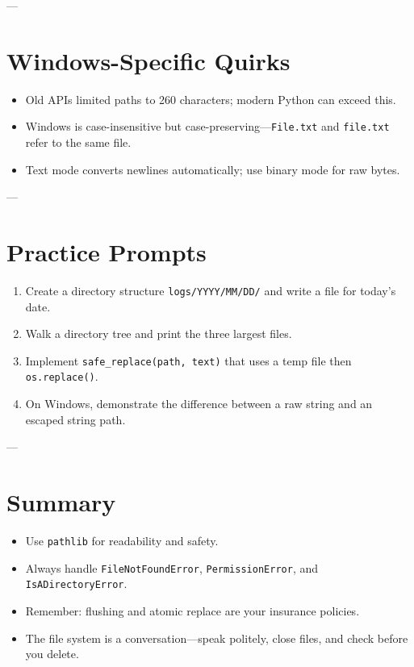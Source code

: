 ---

\section{Windows-Specific Quirks}

\begin{itemize}
  \item Old APIs limited paths to 260 characters; modern Python can exceed this.
  \item Windows is case-insensitive but case-preserving—\texttt{File.txt} and \texttt{file.txt} refer to the same file.
  \item Text mode converts newlines automatically; use binary mode for raw bytes.
\end{itemize}

---

\section{Practice Prompts}

\begin{enumerate}
  \item Create a directory structure \verb|logs/YYYY/MM/DD/| and write a file for today's date.
  \item Walk a directory tree and print the three largest files.
  \item Implement \verb|safe_replace(path, text)| that uses a temp file then \texttt{os.replace()}.
  \item On Windows, demonstrate the difference between a raw string and an escaped string path.
\end{enumerate}

---

\section*{Summary}

\begin{itemize}
  \item Use \texttt{pathlib} for readability and safety.
  \item Always handle \texttt{FileNotFoundError}, \texttt{PermissionError}, and \texttt{IsADirectoryError}.
  \item Remember: flushing and atomic replace are your insurance policies.
  \item The file system is a conversation—speak politely, close files, and check before you delete.
\end{itemize}
